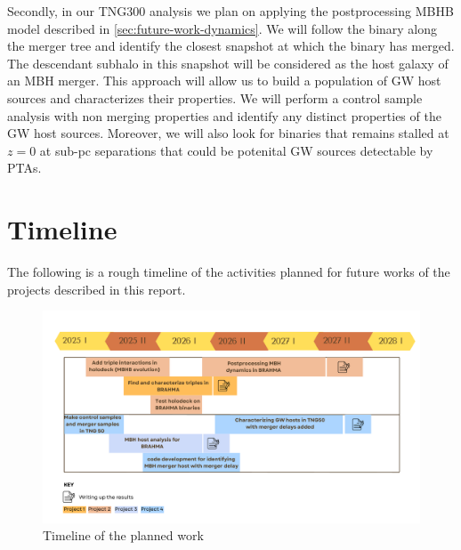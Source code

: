 \documentclass[11pt, letterpaper]{article}
\begin{document}
Secondly, in our TNG300 analysis we plan on applying the postprocessing MBHB model described in \ref{sec:future-work-dynamics}. We will follow the binary along the merger tree and identify the closest snapshot at which the binary has merged. The descendant subhalo in this snapshot will be considered as the host galaxy of an MBH merger. This approach will allow us to build a population of GW host sources and characterizes their properties. We will perform a control sample analysis with non merging properties and identify any distinct properties of the GW host sources. Moreover, we will also look for binaries that remains stalled at $z=0$ at sub-pc separations that could be potenital GW sources detectable by PTAs. 




\section{Timeline}
\label{sec:timeline}
The following is a rough timeline of the activities planned for future works of the projects described in this  report. 

\begin{figure}[!htb]
    \centering
    \includegraphics[scale=0.34]{fig/Graduate timeline.pdf}
    \caption{Timeline of the planned work}
    \label{fig:timeline}
\end{figure}
\end{document}
